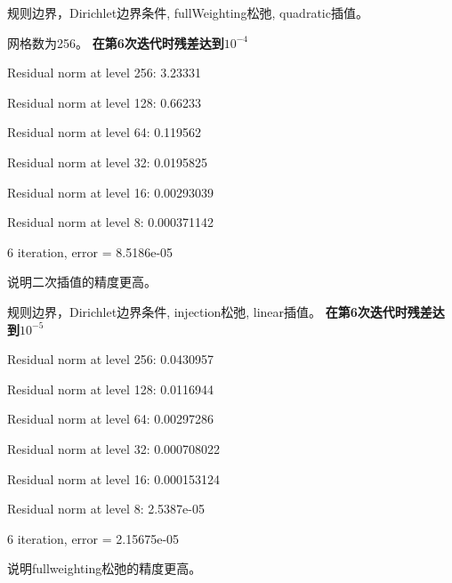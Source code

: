 \documentclass[UTF8]{ctexart}
\begin{document}
规则边界，Dirichlet边界条件, fullWeighting松弛, quadratic插值。

网格数为256。
    \textbf{在第6次迭代时残差达到$10^{-4}$}

    Residual norm at level 256: 3.23331

    Residual norm at level 128: 0.66233

    Residual norm at level 64: 0.119562

    Residual norm at level 32: 0.0195825

    Residual norm at level 16: 0.00293039

    Residual norm at level 8: 0.000371142

    6 iteration, error = 8.5186e-05


说明二次插值的精度更高。

规则边界，Dirichlet边界条件, injection松弛, linear插值。
    \textbf{在第6次迭代时残差达到$10^{-5}$}

    Residual norm at level 256: 0.0430957

    Residual norm at level 128: 0.0116944

    Residual norm at level 64: 0.00297286

    Residual norm at level 32: 0.000708022

    Residual norm at level 16: 0.000153124

    Residual norm at level 8: 2.5387e-05

    6 iteration, error = 2.15675e-05

说明fullweighting松弛的精度更高。
\end{document}
